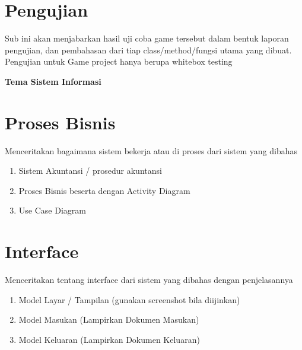 \section{Pengujian}
\begin{sectioncontent}
    \hspace{\parindent}Sub  ini akan menjabarkan hasil uji coba game tersebut dalam bentuk laporan pengujian, dan pembahasan dari tiap class/method/fungsi utama yang dibuat. Pengujian untuk Game project hanya berupa whitebox testing
\end{sectioncontent}

\textbf{Tema Sistem Informasi}

\setcounter{section}{0} %
\setcounter{subsection}{0} %

\section{Proses Bisnis}
\begin{sectioncontent}
    Menceritakan bagaimana sistem bekerja atau di proses dari sistem yang dibahas
    \begin{enumerate}[leftmargin=0.5cm]
        \item Sistem Akuntansi / prosedur akuntansi
        \item Proses Bisnis beserta dengan Activity Diagram
        \item Use Case Diagram
    \end{enumerate}
\end{sectioncontent}

\section{Interface}
\begin{sectioncontent}
    Menceritakan tentang interface dari sistem yang dibahas dengan penjelasannya
    \begin{enumerate}[leftmargin=0.5cm]
        \item Model Layar / Tampilan (gunakan screenshot bila diijinkan)
        \item Model Masukan (Lampirkan Dokumen Masukan)
        \item Model Keluaran (Lampirkan Dokumen Keluaran)
    \end{enumerate}
\end{sectioncontent}

